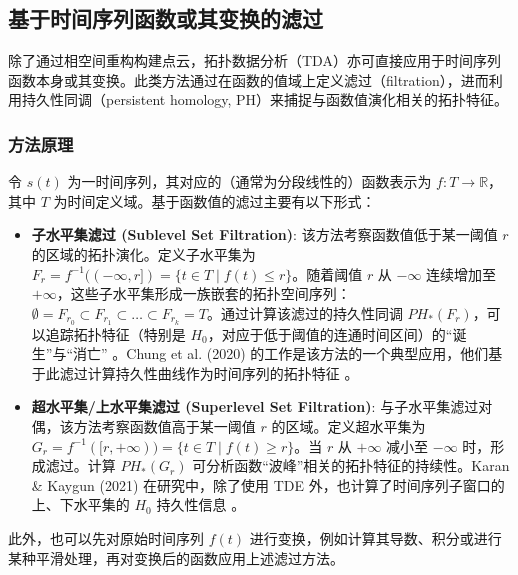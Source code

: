 \subsection{基于时间序列函数或其变换的滤过}
\label{sec:func_filtration}
除了通过相空间重构构建点云，拓扑数据分析（TDA）亦可直接应用于时间序列函数本身或其变换。此类方法通过在函数的值域上定义滤过（filtration），进而利用持久性同调（persistent homology, PH）来捕捉与函数值演化相关的拓扑特征。
\subsubsection{方法原理}
\label{sec:func_filtration_principle}

令 $s(t)$ 为一时间序列，其对应的（通常为分段线性的）函数表示为 $f: T \to \mathbb{R}$，其中 $T$ 为时间定义域。基于函数值的滤过主要有以下形式：
\begin{itemize}
    \item \textbf{子水平集滤过 (Sublevel Set Filtration)}: 该方法考察函数值低于某一阈值 $r$ 的区域的拓扑演化。定义子水平集为 $F_r = f^{-1}((-\infty, r]) = \{t \in T \mid f(t) \le r\}$。随着阈值 $r$ 从 $-\infty$ 连续增加至 $+\infty$，这些子水平集形成一族嵌套的拓扑空间序列：$\emptyset = F_{r_0} \subset F_{r_1} \subset \dots \subset F_{r_k} = T$。通过计算该滤过的持久性同调 $PH_*(F_r)$，可以追踪拓扑特征（特别是 $H_0$，对应于低于阈值的连通时间区间）的“诞生”与“消亡” \cite{Chung2020PHApproachTSC}。Chung et al. (2020) 的工作是该方法的一个典型应用，他们基于此滤过计算持久性曲线作为时间序列的拓扑特征 \cite{Chung2020PHApproachTSC}。

    \item \textbf{超水平集/上水平集滤过 (Superlevel Set Filtration)}: 与子水平集滤过对偶，该方法考察函数值高于某一阈值 $r$ 的区域。定义超水平集为 $G_r = f^{-1}([r, +\infty)) = \{t \in T \mid f(t) \ge r\}$。当 $r$ 从 $+\infty$ 减小至 $-\infty$ 时，形成滤过。计算 $PH_*(G_r)$ 可分析函数“波峰”相关的拓扑特征的持续性。Karan \& Kaygun (2021) 在研究中，除了使用 TDE 外，也计算了时间序列子窗口的上、下水平集的 $H_0$ 持久性信息 \cite{Karan2021TSClassificationViaTDA}。
\end{itemize}
此外，也可以先对原始时间序列 $f(t)$ 进行变换，例如计算其导数、积分或进行某种平滑处理，再对变换后的函数应用上述滤过方法。


